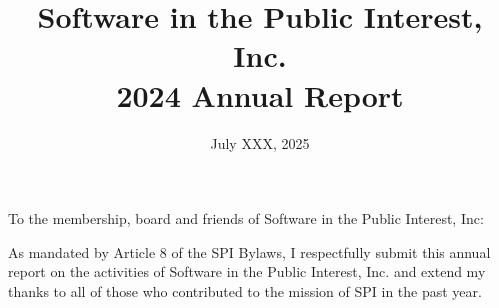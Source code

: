 \documentclass[a4paper]{report}
\begin{document}
\title{Software in the Public Interest, Inc.\\
2024 Annual Report}
\date{July XXX, 2025}

\maketitle

\newpage


\hspace{1em}

To the membership, board and friends of Software in the Public Interest, Inc:

As mandated by Article 8 of the SPI Bylaws, I respectfully submit this annual report on the activities of Software in the Public Interest, Inc. and extend my thanks to all of those who contributed to the mission of SPI in the past year.
\end{document}

